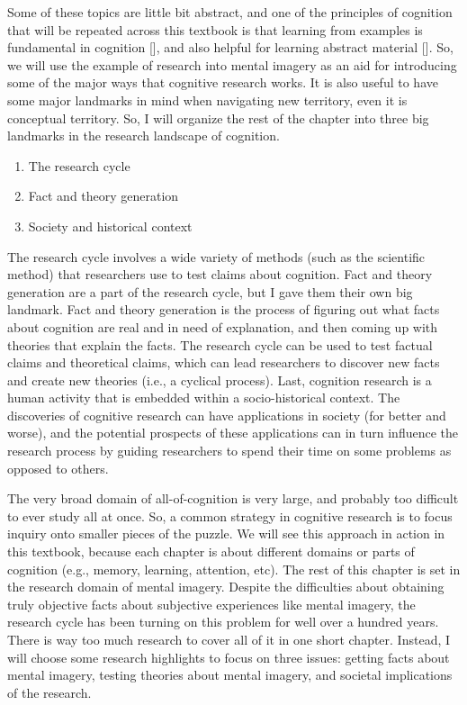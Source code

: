 \documentclass[
  oneside,
  12pt]{crumpbook}
\providecommand{\tightlist}{%
  \setlength{\itemsep}{0pt}\setlength{\parskip}{0pt}}
\begin{document}
Some of these topics are little bit abstract, and one of the principles of cognition that will be repeated across this textbook is that learning from examples is fundamental in cognition {[}{]}, and also helpful for learning abstract material {[}{]}. So, we will use the example of research into mental imagery as an aid for introducing some of the major ways that cognitive research works. It is also useful to have some major landmarks in mind when navigating new territory, even it is conceptual territory. So, I will organize the rest of the chapter into three big landmarks in the research landscape of cognition.

\begin{enumerate}
\def\labelenumi{\arabic{enumi}.}
\tightlist
\item
  The research cycle
\item
  Fact and theory generation
\item
  Society and historical context
\end{enumerate}

The research cycle involves a wide variety of methods (such as the scientific method) that researchers use to test claims about cognition. Fact and theory generation are a part of the research cycle, but I gave them their own big landmark. Fact and theory generation is the process of figuring out what facts about cognition are real and in need of explanation, and then coming up with theories that explain the facts. The research cycle can be used to test factual claims and theoretical claims, which can lead researchers to discover new facts and create new theories (i.e., a cyclical process). Last, cognition research is a human activity that is embedded within a socio-historical context. The discoveries of cognitive research can have applications in society (for better and worse), and the potential prospects of these applications can in turn influence the research process by guiding researchers to spend their time on some problems as opposed to others.

The very broad domain of all-of-cognition is very large, and probably too difficult to ever study all at once. So, a common strategy in cognitive research is to focus inquiry onto smaller pieces of the puzzle. We will see this approach in action in this textbook, because each chapter is about different domains or parts of cognition (e.g., memory, learning, attention, etc). The rest of this chapter is set in the research domain of mental imagery. Despite the difficulties about obtaining truly objective facts about subjective experiences like mental imagery, the research cycle has been turning on this problem for well over a hundred years. There is way too much research to cover all of it in one short chapter. Instead, I will choose some research highlights to focus on three issues: getting facts about mental imagery, testing theories about mental imagery, and societal implications of the research.
\end{document}

